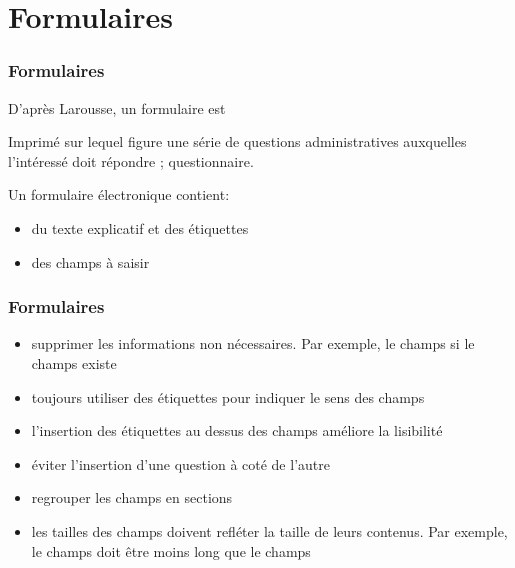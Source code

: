 \documentclass[xcolor=table]{beamer}
\begin{document}
\section{Formulaires}

\begin{frame}
\frametitle{Formulaires}

\begin{minipage}{0.50\textwidth}
	D'après Larousse, un formulaire est 
	{
	\setlength{\textwidth}{.9\textwidth}%
	\begin{definition}
		Imprimé sur lequel figure une série de questions administratives auxquelles l'intéressé doit répondre ; questionnaire.
	\end{definition}
    }

	Un formulaire électronique contient:
	\begin{itemize}
		\item du texte explicatif et des étiquettes
		\item des champs à saisir 
	\end{itemize}
\end{minipage}
\begin{minipage}{0.49\textwidth}
\end{minipage}

\end{frame}

\begin{frame}
\frametitle{Formulaires}

\begin{itemize}
	\item supprimer les informations non nécessaires. Par exemple, le champs  si le champs  existe
	\item toujours utiliser des étiquettes pour indiquer le sens des champs
	\item l'insertion des étiquettes au dessus des champs améliore la lisibilité
	\item éviter l'insertion d'une question à coté de l'autre
	\item regrouper les champs en sections 
	\item les tailles des champs doivent refléter la taille de leurs contenus. Par exemple, le champs  doit être moins long que le champs 
\end{itemize}

\end{frame}
\end{document}
